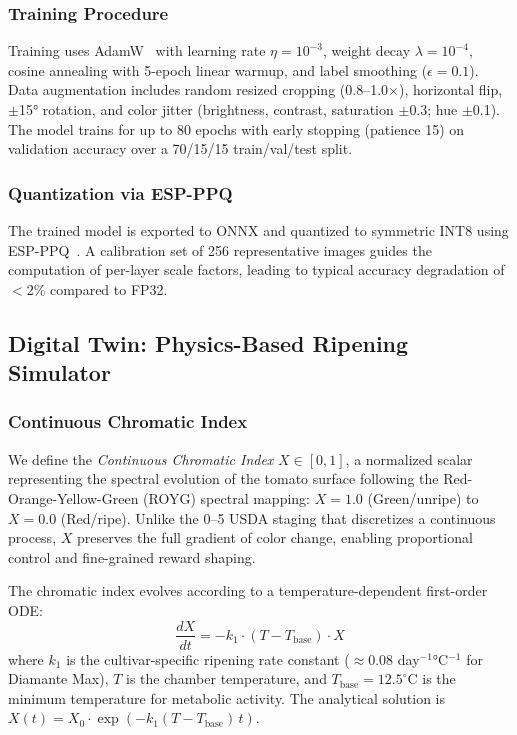 \documentclass[conference]{IEEEtran}
\begin{document}
\subsubsection{Training Procedure}
Training uses AdamW~\cite{loshchilov2019adamw} with learning rate $\eta = 10^{-3}$, weight decay $\lambda = 10^{-4}$, cosine annealing with 5-epoch linear warmup, and label smoothing ($\epsilon = 0.1$). Data augmentation includes random resized cropping (0.8--1.0$\times$), horizontal flip, $\pm$15° rotation, and color jitter (brightness, contrast, saturation $\pm$0.3; hue $\pm$0.1). The model trains for up to 80 epochs with early stopping (patience 15) on validation accuracy over a 70/15/15 train/val/test split.

\subsubsection{Quantization via ESP-PPQ}
The trained model is exported to ONNX and quantized to symmetric INT8 using ESP-PPQ~\cite{espdl2024}. A calibration set of 256 representative images guides the computation of per-layer scale factors, leading to typical accuracy degradation of $<$2\% compared to FP32.

\subsection{Digital Twin: Physics-Based Ripening Simulator}

\subsubsection{Continuous Chromatic Index}
\label{sec:chromatic_index}
We define the \textit{Continuous Chromatic Index} $X \in [0, 1]$, a normalized scalar representing the spectral evolution of the tomato surface following the Red-Orange-Yellow-Green (ROYG) spectral mapping: $X = 1.0$ (Green/unripe) to $X = 0.0$ (Red/ripe). Unlike the 0--5 USDA staging \cite{usda1991} that discretizes a continuous process, $X$ preserves the full gradient of color change, enabling proportional control and fine-grained reward shaping.

The chromatic index evolves according to a temperature-dependent first-order ODE:
\begin{equation}
\frac{dX}{dt} = -k_1 \cdot (T - T_{\text{base}}) \cdot X
\label{eq:ripening}
\end{equation}
\noindent where $k_1$ is the cultivar-specific ripening rate constant ($\approx 0.08$ day$^{-1}$°C$^{-1}$ for Diamante Max), $T$ is the chamber temperature, and $T_{\text{base}} = 12.5^{\circ}$C is the minimum temperature for metabolic activity. The analytical solution is $X(t) = X_0 \cdot \exp(-k_1 (T - T_{\text{base}}) \, t)$.
\end{document}
